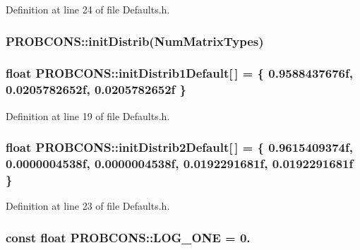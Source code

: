 Definition at line 24 of file Defaults.\+h.

\hypertarget{namespace_p_r_o_b_c_o_n_s_a4fa8c099c73924e7f54dc5dbf2377aff}{
\subsubsection[{init\+Distrib}]{ P\+R\+O\+B\+C\+O\+N\+S\+::init\+Distrib({\bf Num\+Matrix\+Types})}}\label{namespace_p_r_o_b_c_o_n_s_a4fa8c099c73924e7f54dc5dbf2377aff}
\hypertarget{namespace_p_r_o_b_c_o_n_s_aa8038b03680de2e2d9a1887d20b5467f}{
\subsubsection[{init\+Distrib1\+Default}]{\setlength{\rightskip}{0pt plus 5cm}float P\+R\+O\+B\+C\+O\+N\+S\+::init\+Distrib1\+Default\mbox{[}$\,$\mbox{]} = \{ 0.\+9588437676f, 0.\+0205782652f, 0.\+0205782652f \}}}\label{namespace_p_r_o_b_c_o_n_s_aa8038b03680de2e2d9a1887d20b5467f}


Definition at line 19 of file Defaults.\+h.

\hypertarget{namespace_p_r_o_b_c_o_n_s_a7c5ee053f6a08b12797553be09091fbb}{
\subsubsection[{init\+Distrib2\+Default}]{\setlength{\rightskip}{0pt plus 5cm}float P\+R\+O\+B\+C\+O\+N\+S\+::init\+Distrib2\+Default\mbox{[}$\,$\mbox{]} = \{ 0.\+9615409374f, 0.\+0000004538f, 0.\+0000004538f, 0.\+0192291681f, 0.\+0192291681f \}}}\label{namespace_p_r_o_b_c_o_n_s_a7c5ee053f6a08b12797553be09091fbb}


Definition at line 23 of file Defaults.\+h.

\hypertarget{namespace_p_r_o_b_c_o_n_s_a5b8b50011bc3908106307aacd3a58d6e}{
\subsubsection[{L\+O\+G\+\_\+\+O\+N\+E}]{\setlength{\rightskip}{0pt plus 5cm}const float P\+R\+O\+B\+C\+O\+N\+S\+::\+L\+O\+G\+\_\+\+O\+N\+E = 0.}}\label{namespace_p_r_o_b_c_o_n_s_a5b8b50011bc3908106307aacd3a58d6e}



